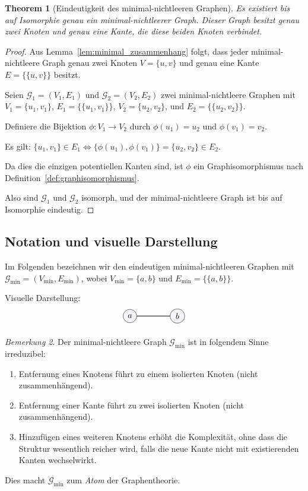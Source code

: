 \documentclass[12pt, a4paper]{article}
\newtheorem{theorem}{Theorem}[section]
\theoremstyle{definition}
\theoremstyle{remark}
\newtheorem{remark}[theorem]{Bemerkung}
\newcommand{\Graph}{\mathcal{G}}
\begin{document}
\begin{theorem}[Eindeutigkeit des minimal-nichtleeren Graphen]
\label{thm:eindeutigkeit_minimal}
Es existiert bis auf Isomorphie genau ein minimal-nichtleerer Graph. Dieser Graph besitzt genau zwei Knoten und genau eine Kante, die diese beiden Knoten verbindet.
\end{theorem}

\begin{proof}
Aus Lemma~\ref{lem:minimal_zusammenhang} folgt, dass jeder minimal-nichtleere Graph genau zwei Knoten $V = \{u, v\}$ und genau eine Kante $E = \{\{u, v\}\}$ besitzt.

Seien $\Graph_1 = (V_1, E_1)$ und $\Graph_2 = (V_2, E_2)$ zwei minimal-nichtleere Graphen mit $V_1 = \{u_1, v_1\}$, $E_1 = \{\{u_1, v_1\}\}$, $V_2 = \{u_2, v_2\}$, und $E_2 = \{\{u_2, v_2\}\}$.

Definiere die Bijektion $\phi: V_1 \to V_2$ durch $\phi(u_1) = u_2$ und $\phi(v_1) = v_2$.

Es gilt: $\{u_1, v_1\} \in E_1 \iff \{\phi(u_1), \phi(v_1)\} = \{u_2, v_2\} \in E_2$.

Da dies die einzigen potentiellen Kanten sind, ist $\phi$ ein Graphisomorphismus nach Definition~\ref{def:graphisomorphismus}.

Also sind $\Graph_1$ und $\Graph_2$ isomorph, und der minimal-nichtleere Graph ist bis auf Isomorphie eindeutig.
\end{proof}

\subsection{Notation und visuelle Darstellung}
\label{subsec:minimal_notation}

Im Folgenden bezeichnen wir den eindeutigen minimal-nichtleeren Graphen mit $\Graph_{\min} = (V_{\min}, E_{\min})$, wobei $V_{\min} = \{a, b\}$ und $E_{\min} = \{\{a, b\}\}$.

Visuelle Darstellung:
\[
\begin{tikzpicture}[node distance=2cm, auto]
  \node (a) [circle, draw, fill=lightgray] {$a$};
  \node (b) [circle, draw, fill=lightgray, right of=a] {$b$};
  \path[draw, thick] (a) -- (b);
\end{tikzpicture}
\]

\begin{remark}
\label{rem:minimalitaet_vergleich}
Der minimal-nichtleere Graph $\Graph_{\min}$ ist in folgendem Sinne irreduzibel:
\begin{enumerate}[label=(\alph*)]
  \item Entfernung eines Knotens führt zu einem isolierten Knoten (nicht zusammenhängend).
  \item Entfernung einer Kante führt zu zwei isolierten Knoten (nicht zusammenhängend).
  \item Hinzufügen eines weiteren Knotens erhöht die Komplexität, ohne dass die Struktur wesentlich reicher wird, falls die neue Kante nicht mit existierenden Kanten wechselwirkt.
\end{enumerate}
Dies macht $\Graph_{\min}$ zum \emph{Atom} der Graphentheorie.
\end{remark}
\end{document}
